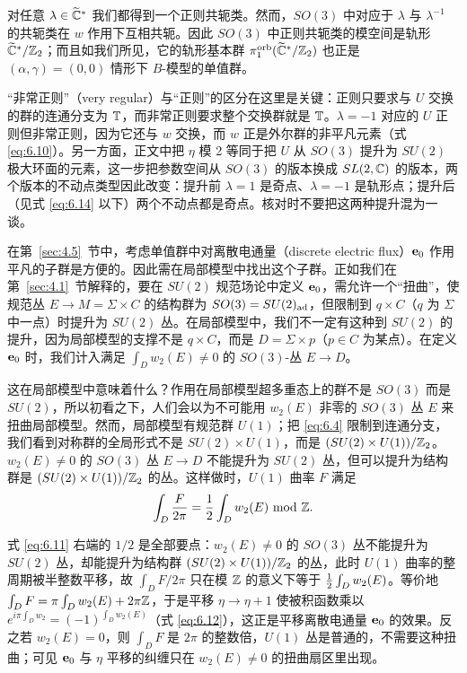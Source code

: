对任意 $\lambda\in \widetilde{{\mathbb{C}}}^*$ 我们都得到一个正则共轭类。然而，$SO(3)$ 中对应于 $\lambda$ 与 $\lambda^{-1}$ 的共轭类在 $w$ 作用下互相共轭。因此 $SO(3)$ 中正则共轭类的模空间是轨形 $\widetilde{{\mathbb{C}}}^*/{\mathbb{Z}}_2$；而且如我们所见，它的轨形基本群 $\pi_1^{\rm orb}(\widetilde {{\mathbb{C}}}^*/{\mathbb{Z}}_2)$ 也正是 $(\alpha,\gamma)=(0,0)$ 情形下 $B$-模型的单值群。

\begin{yizhu}[易错点]“非常正则”（very regular）与“正则”的区分在这里是关键：正则只要求与 $U$ 交换的群的连通分支为 ${\mathbb{T}}$，而非常正则要求整个交换群就是 ${\mathbb{T}}$。$\lambda=-1$ 对应的 $U$ 正则但非常正则，因为它还与 $w$ 交换，而 $w$ 正是外尔群的非平凡元素（式 \eqref{eq:6.10}）。另一方面，正文中把 $\eta$ 模 2 等同于把 $U$ 从 $SO(3)$ 提升为 $SU(2)$ 极大环面的元素，这一步把参数空间从 $SO(3)$ 的版本换成 $SL(2,{\mathbb{C}})$ 的版本，两个版本的不动点类型因此改变：提升前 $\lambda=1$ 是奇点、$\lambda=-1$ 是轨形点；提升后（见式 \eqref{eq:6.14} 以下）两个不动点都是奇点。核对时不要把这两种提升混为一谈。\end{yizhu}

在第~\ref{sec:4.5}~节中，考虑单值群中对离散电通量（discrete electric flux）${\bf e}_0$ 作用平凡的子群是方便的。因此需在局部模型中找出这个子群。正如我们在第~\ref{sec:4.1}~节解释的，要在 $SU(2)$ 规范场论中定义 ${\bf e}_0$，需允许一个“扭曲”，使规范丛 $E\to M=\Sigma\times C$ 的结构群为 $SO(3)=SU(2)_{\rm ad}$，但限制到 $q\times C$（$q$ 为 $\Sigma$ 中一点）时提升为 $SU(2)$ 丛。在局部模型中，我们不一定有这种到 $SU(2)$ 的提升，因为局部模型的支撑不是 $q\times C$，而是 $D=\Sigma\times p$（$p\in C$ 为某点）。在定义 ${\bf e}_0$ 时，我们计入满足 $\int_Dw_2(E)\not=0$ 的 $SO(3)$-丛 $E\to D$。

这在局部模型中意味着什么？作用在局部模型超多重态上的群不是 $SO(3)$ 而是 $SU(2)$，所以初看之下，人们会以为不可能用 $w_2(E)$ 非零的 $SO(3)$ 丛 $E$ 来扭曲局部模型。然而，局部模型有规范群 $U(1)$；把 \eqref{eq:6.4} 限制到连通分支，我们看到对称群的全局形式不是 $SU(2)\times U(1)$，而是 $(SU(2)\times U(1))/{\mathbb{Z}}_2$。$w_2(E)\not=0$ 的 $SO(3)$ 丛 $E\to D$ 不能提升为 $SU(2)$ 丛，但可以提升为结构群是 $(SU(2)\times U(1))/{\mathbb{Z}}_2$ 的丛。这样做时，$U(1)$ 曲率 $F$ 满足
\setcounter{equation}{10}
\begin{equation}\label{eq:6.11}
  \int_D{F\over 2\pi}={1\over 2}\int_Dw_2(E)~{\rm mod}~{\mathbb{Z}}.
\end{equation}

\begin{yizhu}[含糊点拨]式 \eqref{eq:6.11} 右端的 $1/2$ 是全部要点：$w_2(E)\not=0$ 的 $SO(3)$ 丛不能提升为 $SU(2)$ 丛，却能提升为结构群 $(SU(2)\times U(1))/{\mathbb{Z}}_2$ 的丛，此时 $U(1)$ 曲率的整周期被半整数平移，故 $\int_DF/2\pi$ 只在模 ${\mathbb{Z}}$ 的意义下等于 ${1\over 2}\int_Dw_2(E)$。等价地 $\int_DF=\pi\int_Dw_2(E)+2\pi{\mathbb{Z}}$，于是平移 $\eta\to\eta+1$ 使被积函数乘以 $e^{i\pi\int_Dw_2}=(-1)^{\int_Dw_2(E)}$（式 \eqref{eq:6.12}），这正是平移离散电通量 ${\bf e}_0$ 的效果。反之若 $w_2(E)=0$，则 $\int_DF$ 是 $2\pi$ 的整数倍，$U(1)$ 丛是普通的，不需要这种扭曲；可见 ${\bf e}_0$ 与 $\eta$ 平移的纠缠只在 $w_2(E)\not=0$ 的扭曲扇区里出现。\end{yizhu}

